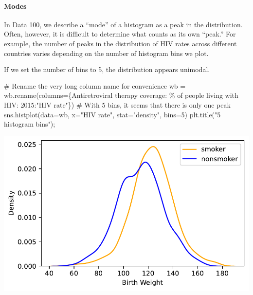 \documentclass[
  letterpaper,
  DIV=11,
  numbers=noendperiod]{scrreprt}
\let\oldparagraph\paragraph
\renewcommand{\paragraph}[1]{\oldparagraph{#1}\mbox{}}
\newenvironment{Shaded}{\begin{snugshade}}{\end{snugshade}}
\newcommand{\CommentTok}[1]{\textcolor[rgb]{0.37,0.37,0.37}{#1}}
\newcommand{\DecValTok}[1]{\textcolor[rgb]{0.68,0.00,0.00}{#1}}
\newcommand{\NormalTok}[1]{\textcolor[rgb]{0.00,0.23,0.31}{#1}}
\newcommand{\OperatorTok}[1]{\textcolor[rgb]{0.37,0.37,0.37}{#1}}
\newcommand{\SpecialCharTok}[1]{\textcolor[rgb]{0.37,0.37,0.37}{#1}}
\newcommand{\StringTok}[1]{\textcolor[rgb]{0.13,0.47,0.30}{#1}}
\begin{document}
\paragraph{Modes}\label{modes}

In Data 100, we describe a ``mode'' of a histogram as a peak in the
distribution. Often, however, it is difficult to determine what counts
as its own ``peak.'' For example, the number of peaks in the
distribution of HIV rates across different countries varies depending on
the number of histogram bins we plot.

If we set the number of bins to 5, the distribution appears unimodal.

\begin{Shaded}
\begin{Highlighting}[]
\CommentTok{\# Rename the very long column name for convenience}
\NormalTok{wb }\OperatorTok{=}\NormalTok{ wb.rename(columns}\OperatorTok{=}\NormalTok{\{}\StringTok{\textquotesingle{}Antiretroviral therapy coverage: }\SpecialCharTok{\% o}\StringTok{f people living with HIV: 2015\textquotesingle{}}\NormalTok{:}\StringTok{"HIV rate"}\NormalTok{\})}
\CommentTok{\# With 5 bins, it seems that there is only one peak}
\NormalTok{sns.histplot(data}\OperatorTok{=}\NormalTok{wb, x}\OperatorTok{=}\StringTok{"HIV rate"}\NormalTok{, stat}\OperatorTok{=}\StringTok{"density"}\NormalTok{, bins}\OperatorTok{=}\DecValTok{5}\NormalTok{)}
\NormalTok{plt.title(}\StringTok{"5 histogram bins"}\NormalTok{)}\OperatorTok{;}
\end{Highlighting}
\end{Shaded}

\includegraphics{visualization_1/visualization_1_files/figure-pdf/cell-21-output-1.pdf}
\end{document}
